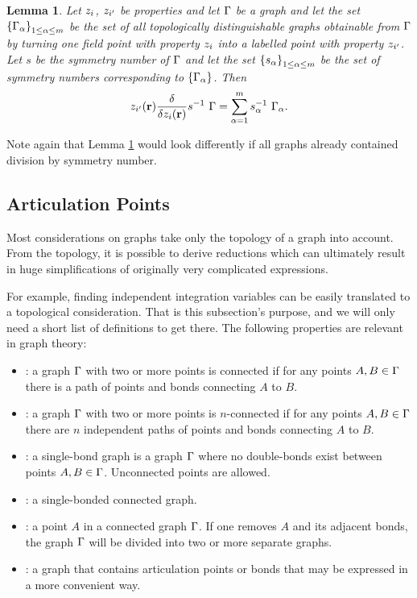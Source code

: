 \documentclass[8.5pt,twoside,twocolumn]{article}
\newcommand\zi{\enmat{z_i}}
\newcommand\zip{\enmat{z_{i'}}}
\renewcommand\r{\bo r}
\theoremstyle{standard}
\newtheorem{lem}[theo]{Lemma}
\begin{document}

\begin{lem}
Let $\zi$, $\zip$ be properties and let $\Gamma$ be a graph and let the set $\left\{{\Gamma_{\alpha}} \right\}_{1\le\alpha\le m}$ be the set
of all topologically distinguishable graphs obtainable from $\Gamma$ by turning one field point with property
$\zi$ into a labelled point with property $\zip$. Let $s$ be the symmetry number of $\Gamma$ and let the set
$\left\{{s_{\alpha}} \right\}_{1\le\alpha\le m}$ be the set of symmetry numbers corresponding to $\left\{{\Gamma_{\alpha}} \right\}$. Then
\begin{equation}
\zip(\r)\delti{}{\zi(\r)} s\iv\ \Ga = \sum_{\al=1}^m s_\al\iv\ \Ga_\al.
\end{equation}
\label{funcderi2}
\end{lem}
Note again that Lemma \ref{funcderi2} would look differently if all graphs already
contained division by symmetry number.

\subsection{Articulation Points}
\label{ArtPoint}

Most considerations on graphs take only the topology of a graph into account. From the
topology, it is possible to derive reductions which can ultimately result in
huge simplifications of originally very complicated expressions.

For example, finding independent integration variables can be easily translated to a topological consideration.
That is this subsection's purpose, and we will only need a short list of definitions
to get there. The following properties are relevant in graph theory:

\begin{itemize}
  \item {}: a graph $\Gamma$ with two or more points is connected if for any points
  $A, B \in \Gamma$ there is a path of points and bonds connecting $A$ to $B$.
  \item {}: a graph $\Gamma$ with two or more points is
  $n$-connected if for any points $A, B \in \Gamma$ there are $n$ independent paths of points and bonds
  connecting $A$ to $B$.
  \item {}: a single-bond graph is a graph $\Gamma$ where no double-bonds
  exist between points $A, B \in \Gamma$. Unconnected points are allowed.
  \item {}: a single-bonded connected graph.
  \item {}: a point $A$ in a connected graph $\Gamma$. If one removes
  $A$ and its adjacent bonds, the graph $\Gamma$ will be divided into two or more separate graphs.
  \item {}: a graph that contains articulation points or bonds that may be
  expressed in a more convenient way.
\end{itemize}
\end{document}
